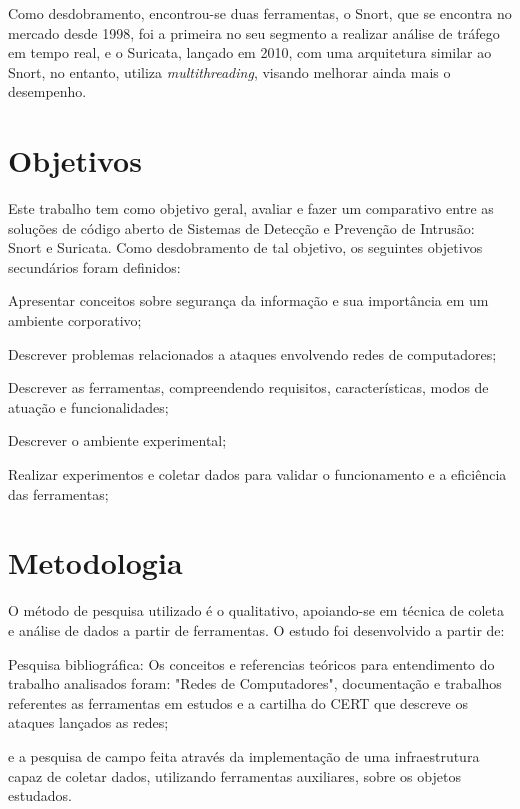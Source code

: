 Como desdobramento, encontrou-se duas ferramentas, o Snort, que se encontra no mercado desde 1998, foi a primeira no seu segmento a realizar análise de tráfego em tempo real, e o Suricata, lançado em 2010, com uma arquitetura similar ao Snort, no entanto, utiliza \textit{multithreading}, visando melhorar ainda mais o desempenho.

\section{Objetivos} \label{sec:objetivos}

Este trabalho tem como objetivo geral, avaliar e fazer um comparativo entre as soluções de código aberto de Sistemas de Detecção e Prevenção de Intrusão: Snort e Suricata. Como desdobramento de tal objetivo, os seguintes objetivos secundários foram definidos:

\begin{alineas}
\item Apresentar conceitos sobre segurança da informação e sua importância em um ambiente corporativo;
\item Descrever problemas relacionados a ataques envolvendo redes de computadores;
\item Descrever as ferramentas, compreendendo requisitos, características, modos de atuação e funcionalidades;
\item Descrever o ambiente experimental;
\item Realizar experimentos e coletar dados para validar o funcionamento e a eficiência das ferramentas;
\end{alineas}

\section{Metodologia} \label{sec:metodologia}

O método de pesquisa utilizado é o qualitativo, apoiando-se em técnica de coleta e análise de dados a partir de ferramentas. O estudo foi desenvolvido a partir de:

\begin{alineas}
\item Pesquisa bibliográfica: Os conceitos e referencias teóricos para entendimento do trabalho analisados foram: "Redes de Computadores", documentação e trabalhos referentes as ferramentas em estudos e a cartilha do CERT que descreve os ataques lançados as redes;
\item e a pesquisa de campo feita através da implementação de uma infraestrutura capaz de coletar dados, utilizando ferramentas auxiliares, sobre os objetos estudados.
\end{alineas}

